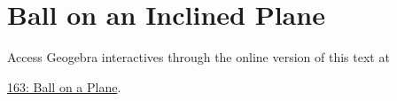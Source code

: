 \documentclass{ximera}
\begin{document}
\section{Ball on an Inclined Plane}

\begin{exploration}
\begin{onlineOnly}
    \begin{center}
\end{center}
\end{onlineOnly}


Access Geogebra interactives through the online version of this text at

 
\href{https://www.geogebra.org/classic/rcmapxuh}{163: Ball on a Plane}.

\end{exploration}
\end{document}
